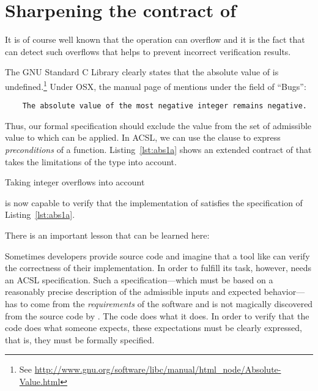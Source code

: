 \section{Sharpening the contract of }
\label{sec:contract-sharpening}

It is of course well known that the operation  can overflow
and it is the fact that \framacwp can detect such overflows that 
helps to prevent incorrect verification results.

The GNU Standard C Library clearly states that the absolute value of
 is undefined.\footnote{%
  See \url{http://www.gnu.org/software/libc/manual/html_node/Absolute-Value.html}
}
Under \textsf{OSX}, the manual page of  mentions under the field of ``Bugs'':
%
\begin{small}
\begin{verbatim}
    The absolute value of the most negative integer remains negative.
\end{verbatim}
\end{small}

Thus, our formal specification should exclude the value 
from the set of admissible value to which  can be applied.
In ACSL, we can use the  clause to express \emph{preconditions}
of a function.
Listing~\ref{lst:abs1a} shows an extended contract of 
that takes the limitations of the type  into account.

\begin{listing}[hbt]
\begin{minipage}{\textwidth}

\end{minipage}
\caption{\label{lst:abs1a} Taking integer overflows into account}
\end{listing}

\FloatBarrier

\framacwp is now capable to verify that the implementation of
 satisfies the specification of Listing~\ref{lst:abs1a}.

There is an important lesson that can be learned here:
\begin{framed}
\label{lesson}
Sometimes developers provide source code and imagine that a tool
like \framacwp can verify the correctness of their implementation.
In order to fulfill its task, however, \framacwp needs an ACSL specification. 
Such a specification---which must be based on a reasonably precise description of the
admissible inputs and expected behavior---has to come from the \emph{requirements}
of the software and is not magically discovered from the source code by \framacwp.
The code does what it does. 
In order to verify that the code does what someone expects, these expectations
must be clearly expressed, that is, they must be formally specified.
\end{framed}

